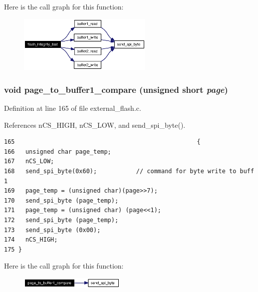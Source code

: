 Here is the call graph for this function:\begin{figure}[H]
\begin{center}
\leavevmode
\includegraphics[width=182pt]{external__flash_8c_a0_cgraph}
\end{center}
\end{figure}
\subsubsection{\setlength{\rightskip}{0pt plus 5cm}void page\_\-to\_\-buffer1\_\-compare (unsigned short {\em page})}\label{external__flash_8c_a3}




Definition at line 165 of file external\_\-flash.c.

References n\-CS\_\-HIGH, n\-CS\_\-LOW, and send\_\-spi\_\-byte().

\footnotesize\begin{verbatim}165                                                   {
166   unsigned char page_temp;
167   nCS_LOW;
168   send_spi_byte(0x60);           // command for byte write to buff 1
169   page_temp = (unsigned char)(page>>7);
170   send_spi_byte (page_temp);
171   page_temp = (unsigned char) (page<<1);
172   send_spi_byte (page_temp);
173   send_spi_byte (0x00);
174   nCS_HIGH;
175 }
\end{verbatim}\normalsize 




Here is the call graph for this function:\begin{figure}[H]
\begin{center}
\leavevmode
\includegraphics[width=144pt]{external__flash_8c_a3_cgraph}
\end{center}
\end{figure}
